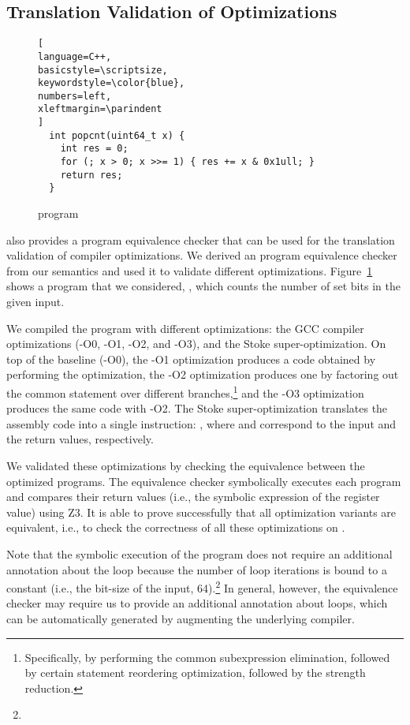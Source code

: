 \subsection{Translation Validation of Optimizations}
\begin{figure}
\begin{lstlisting}[
language=C++,
basicstyle=\scriptsize,
keywordstyle=\color{blue},
numbers=left,
xleftmargin=\parindent
]
  int popcnt(uint64_t x) {
    int res = 0;
    for (; x > 0; x >>= 1) { res += x & 0x1ull; }
    return res;
  }
\end{lstlisting}
\caption{ program}
\label{fig:popcnt}
\end{figure}


\K also provides a program equivalence checker that can be used for the translation validation of compiler optimizations.
We derived an \ISA program equivalence checker from our semantics and used it to validate different optimizations.
Figure~\ref{fig:popcnt} shows a program that we considered, , which counts the number of set bits in the given input.

We compiled the program with different optimizations: the GCC compiler optimizations (-O0, -O1, -O2, and -O3), and the Stoke super-optimization.
On top of the baseline (-O0), the -O1 optimization produces a code obtained by performing the  optimization, the -O2 optimization produces one by factoring out the common statement over different branches,\footnote{Specifically, by performing the common subexpression elimination, followed by certain statement reordering optimization, followed by the strength reduction.} and the -O3 optimization produces the same code with -O2. The Stoke super-optimization translates the assembly code into a single instruction: , where  and  correspond to the input and the return values, respectively.

We validated these optimizations by checking the equivalence between the optimized programs.
The equivalence checker symbolically executes each program and compares their return values (i.e., the symbolic expression of the  register value) using Z3.
It is able to prove successfully that all optimization variants are equivalent, i.e., to check the correctness of all these optimizations on .

Note that the symbolic execution of the  program does not require an additional annotation about the loop because the number of loop iterations is bound to a constant (i.e., the bit-size of the input, 64).\footnote{%
}
In general, however, the equivalence checker may require us to provide an additional annotation about loops, which can be automatically generated by augmenting the underlying compiler.




